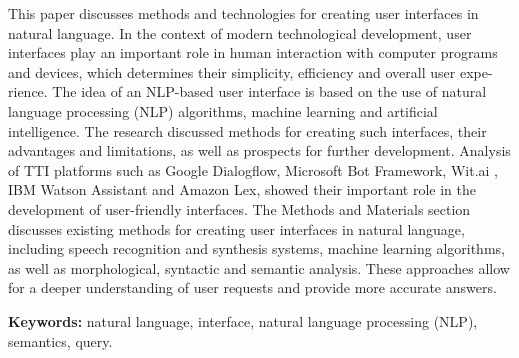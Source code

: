 This paper discusses methods and technologies for creating user
interfaces in natural language. In the context of modern technological
development, user interfaces play an important role in human interaction
with computer programs and devices, which determines their simplicity,
efficiency and overall user expe-rience. The idea of an NLP-based user
interface is based on the use of natural language processing (NLP)
algorithms, machine learning and artificial intelligence. The research
discussed methods for creating such interfaces, their advantages and
limitations, as well as prospects for further development. Analysis of
TTI platforms such as Google Dialogflow, Microsoft Bot Framework, Wit.ai
, IBM Watson Assistant and Amazon Lex, showed their important role in
the development of user-friendly interfaces. The Methods and Materials
section discusses existing methods for creating user interfaces in
natural language, including speech recognition and synthesis systems,
machine learning algorithms, as well as morphological, syntactic and
semantic analysis. These approaches allow for a deeper understanding of
user requests and provide more accurate answers.

{\bfseries Keywords:} natural language, interface, natural language
processing (NLP), semantics, query.

